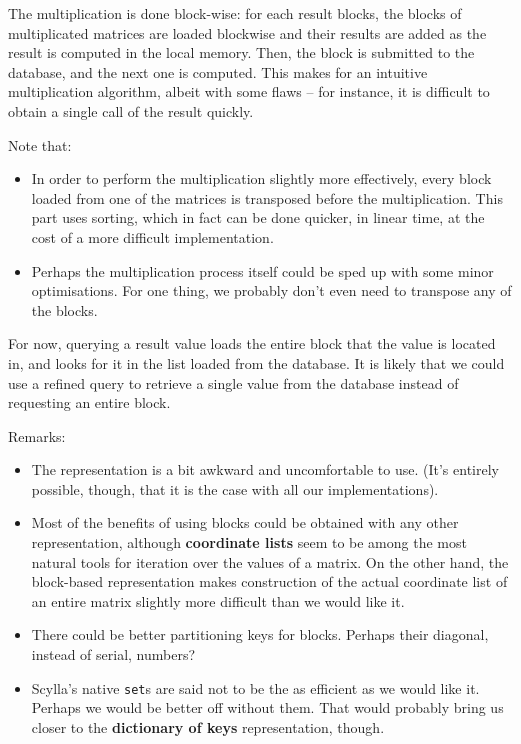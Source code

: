 \documentclass{article}
\newcommand{\code}[0]{\texttt}
\begin{document}
The multiplication is done block-wise: for each result blocks, the blocks of multiplicated matrices are loaded blockwise and their results are added as the result is computed in the local memory. Then, the block is submitted to the database, and the next one is computed. This makes for an intuitive multiplication algorithm, albeit with some flaws -- for instance, it is difficult to obtain a single call of the result quickly. 

Note that:
\begin{itemize}
\item In order to perform the multiplication slightly more effectively, every block loaded from one of the matrices is transposed before the multiplication. This part uses sorting, which in fact can be done quicker, in linear time, at the cost of a more difficult implementation.
\item Perhaps the multiplication process itself could be sped up with some minor optimisations. For one thing, we probably don't even need to transpose any of the blocks.
\end{itemize}

For now, querying a result value loads the entire block that the value is located in, and looks for it in the list loaded from the database. It is likely that we could use a refined query to retrieve a single value from the database instead of requesting an entire block. 

Remarks: 
\begin{itemize} 
\item The representation is a bit awkward and uncomfortable to use. (It's entirely possible, though, that it is the case with all our implementations).
\item Most of the benefits of using blocks could be obtained with any other representation, although \textbf{coordinate lists} seem to be among the most natural tools for iteration over the values of a matrix. On the other hand, the block-based representation makes construction of the actual coordinate list of an entire matrix slightly more difficult than we would like it.
\item There could be better partitioning keys for blocks. Perhaps their diagonal, instead of serial, numbers?
\item Scylla's native \code{set}s are said not to be the as efficient as we would like it. Perhaps we would be better off without them. That would probably bring us closer to the \textbf{dictionary of keys} representation, though.
\end{itemize}
\end{document}
